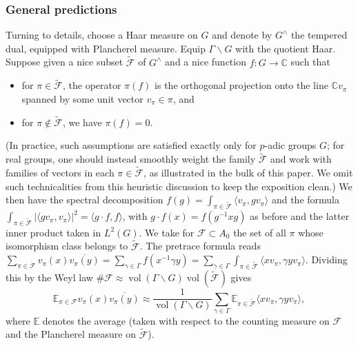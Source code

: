 \documentclass[reqno,10pt]{amsart}
\theoremstyle{plain} %
\theoremstyle{definition}
\theoremstyle{plain} %
\theoremstyle{remark}
\theoremstyle{itplain} %
\theoremstyle{remark} %
\numberwithin{equation}{section}
\DeclareMathOperator{\vol}{vol}
\begin{document}
\subsubsection{General predictions}\label{sec:general-heur}
Turning to details, choose a Haar measure on $G$ and denote by $G^\wedge$ the tempered dual, equipped with Plancherel measure.  Equip $\Gamma \backslash G$ with the quotient Haar.  Suppose given a nice subset $\tilde{\mathcal{F}}$ of $G^\wedge$ and a nice function $f : G \rightarrow \mathbb{C}$ such that
\begin{itemize}
\item for $\pi \in \tilde{\mathcal{F}}$, the operator $\pi(f)$ is the orthogonal projection onto the line $\mathbb{C} v_\pi$ spanned by some unit vector $v_\pi \in \pi$, and
\item for $\pi \notin \tilde{\mathcal{F}}$, we have $\pi(f) = 0$.
\end{itemize}
(In practice, such assumptions are satisfied exactly only for $p$-adic groups $G$; for real groups, one should instead smoothly weight the family $\tilde{\mathcal{F}}$ and work with families of vectors in each $\pi \in \tilde{\mathcal{F}}$, as illustrated in the bulk of this paper.  We omit such technicalities from this heuristic discussion to keep the exposition clean.)  We then have the spectral decomposition $f(g) = \int_{\pi \in \tilde{\mathcal{F}}} \langle v_\pi, g v_\pi \rangle$ and the formula $\int_{\pi \in \tilde{\mathcal{F}}} |\langle g v_\pi, v_\pi \rangle|^2 = \langle g \cdot f, f \rangle$, with $g \cdot f(x) = f(g^{-1} x g)$ as before and the latter inner product taken in $L^2(G)$.  We take for $\mathcal{F} \subset A_0$ the set of all $\pi$ whose isomorphism class belongs to $\tilde{\mathcal{F}}$.  The pretrace formula reads $\sum_{\pi \in \mathcal{F}} v_\pi(x) \overline{v_\pi(y)} = \sum_{\gamma \in \Gamma } f(x^{-1} \gamma y) = \sum_{\gamma \in \Gamma} \int_{\pi \in \tilde{\mathcal{F}}} \langle x v_\pi, \gamma y v_\pi \rangle$.  Dividing this by the Weyl law $\# \mathcal{F} \approx \vol(\Gamma \backslash G) \vol(\tilde{\mathcal{F}})$ gives
\begin{equation}\label{eq:average-v-pi-x-y-heur-1}
  \mathbb{E}_{\pi \in \mathcal{F}}
  v_\pi(x) \overline{v_\pi(y)}
  \approx 
  \frac{1}{\vol(\Gamma \backslash G)}
  \sum_{\gamma \in \Gamma}
  \mathbb{E}_{\pi \in \tilde{\mathcal{F}}}
  \langle x v_\pi, \gamma y v_\pi \rangle,
\end{equation}
where $\mathbb{E}$ denotes the average (taken with respect to the counting measure on $\mathcal{F}$ and the Plancherel measure on $\tilde{\mathcal{F}}$).
\end{document}
